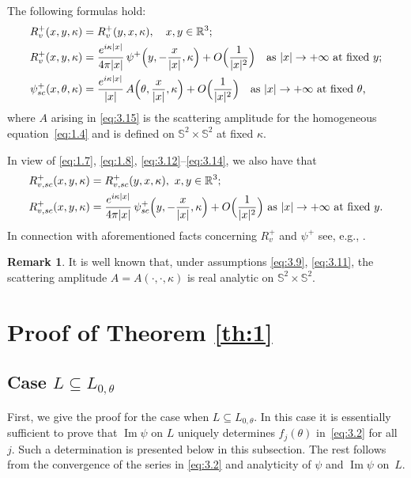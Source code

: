 \documentclass[10pt,a4paper]{amsart}
\let\ra\rightarrow
\newcommand{\RR}{\mathbb R}
\renewcommand{\Im}{\mathop{\mathrm{Im}}}
\theoremstyle{definition}
\newtheorem{remark}{Remark}
\begin{document}
The following formulas hold:
\begin{align}
\label{eq:3.13}
R_v^+(x, y, \kappa)&=R_v^+(y, x, \kappa),\quad x, y\in \RR^3;
\\
\label{eq:3.14}
R_v^+(x, y, \kappa)&=\frac{e^{i\kappa|x|}}{4\pi|x|}\,\psi^+\Bigl(y, -\frac{x}{|x|},\kappa\Bigr)+ O\Bigl(\frac{1}{|x|^2}\Bigr) \quad \mbox{as} \ |x|\ra +\infty\text{ at fixed $y$;}\\
\label{eq:3.15}
\psi^+_{sc}(x,\theta,\kappa)&=\frac{e^{i\kappa|x|}}{|x|}\,A\Bigl(\theta, \frac{x}{|x|},\kappa\Bigr)+ O\Bigl(\frac{1}{|x|^2}\Bigr) \quad \mbox{as} \ |x|\ra +\infty\text{ at fixed $\theta$,}
\end{align}
where $A$ arising in \eqref{eq:3.15} is the scattering amplitude for the homogeneous equation~\eqref{eq:1.4}
and is defined on $\mathbb S^2 \times \mathbb S^2$ at fixed $\kappa$.

In view of \eqref{eq:1.7}, \eqref{eq:1.8}, \eqref{eq:3.12}--\eqref{eq:3.14}, we also have that
\begin{align}
\label{eq:3.16}
R_{v,sc}^+(x, y, \kappa)&=R_{v,sc}^+(y, x, \kappa),\ x, y\in \RR^3;
\\
\label{eq:3.17}
R_{v,sc}^+(x, y, \kappa)&=\frac{e^{i\kappa|x|}}{4\pi|x|}\,\psi_{sc}^+\Bigl(y, -\frac{x}{|x|},\kappa\Bigr)+ O\Bigl(\frac{1}{|x|^2}\Bigr) \ \mbox{as} \ |x|\ra +\infty\text{ at fixed $y$.}
\end{align}
In connection with aforementioned facts concerning $R_v^+$ and $\psi^+$ see, e.g., \cite[Chap.\,IV, \S1]{FM}.

\begin{remark}\label{rem:5}
It is well known that, under assumptions \eqref{eq:3.9}, \eqref{eq:3.11}, the scattering amplitude $A=A(\cdot, \cdot, \kappa)$ is real analytic on $\mathbb S^2 \times \mathbb S^2$.
\end{remark}

\section{Proof of Theorem \ref{th:1}}\label{sec:4}

\subsection{Case $L\subseteq L_{0, \theta}$}\label{subsec:4.1}
First, we give the proof for the case when $L\subseteq L_{0, \theta}$.
In this case it is essentially sufficient to prove that $\Im\psi$ on $L$ uniquely determines $f_j(\theta)$ in~\eqref{eq:3.2} for all $j$.
Such a determination is presented below in this subsection.
The rest follows from the convergence of the series in \eqref{eq:3.2} and analyticity of $\psi$ and $\Im\psi$ on~$L$.
\end{document}
